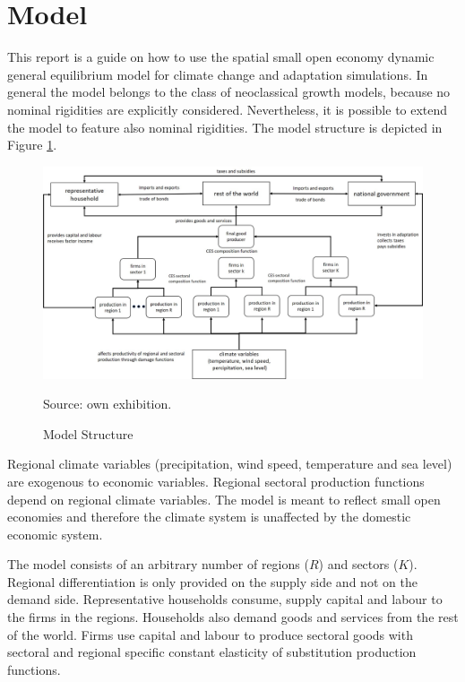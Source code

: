 \documentclass[10pt,a4paper]{article}
\begin{document}
\section{Model}\label{sec:modelderivation}
This report is a guide on how to use the spatial small open economy dynamic general equilibrium model for climate change and adaptation simulations. In general the model belongs to the class of neoclassical growth models, because no nominal rigidities are explicitly considered. Nevertheless, it is possible to extend the model to feature also nominal rigidities. The model structure is depicted in Figure \ref{fig:ModelStructure}.
\begin{figure}[h]
\caption{Model Structure}\label{fig:ModelStructure}
\begin{center}
\includegraphics[width = 1\textwidth, height = 0.7\textwidth]{pictures/ModelStructure.jpg}
\end{center}
\footnotesize{Source: own exhibition.}
\end{figure}
Regional climate variables (precipitation, wind speed, temperature and sea level) are exogenous to economic variables. Regional sectoral production functions depend on regional climate variables. The model is meant to reflect small open economies and therefore the climate system is unaffected by the domestic economic system.

The model consists of an arbitrary number of regions ($R$) and sectors ($K$). Regional differentiation is only provided on the supply side and not on the demand side. Representative households consume, supply capital and labour to the firms in the regions. Households also demand goods and services from the rest of the world. Firms use capital and labour to produce sectoral goods with sectoral and regional specific constant elasticity of substitution production functions.
\end{document}
